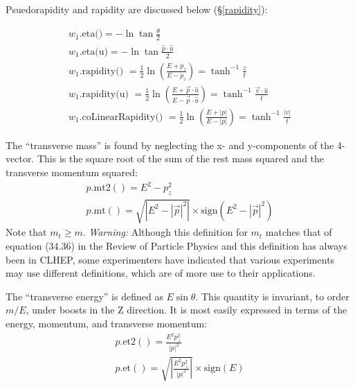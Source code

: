 \documentclass[twoside,12pt]{article}
\begin{document}
Psuedorapidity and rapidity are discussed below (\S\ref{rapidity}):

\begin{eqnarray}
\label{eq:weta}
  w_1\mbox{.eta()} = - \ln \tan \frac{\theta}{2} \\
\label{eq:weta:2}
  w_1\mbox{.eta(u)} = - \ln \tan \frac{\hat{p} \cdot \hat{u}}{2} \\
\label{eq:wrapid}
  w_1\mbox{.rapidity() }
	= \frac{1}{2} \ln \left( \frac{E + p_z}{E - p_z}    \right)
	= \tanh^{-1} \frac {z}{t} \\
\label{eq:wrapid:2}
  w_1\mbox{.rapidity(u) }
	= \frac{1}{2} \ln \left( \frac{E + \vec{p} \cdot \hat{u}}
				      {E - \vec{p} \cdot \hat{u}} \right)
	= \tanh^{-1} \frac {\vec{v} \cdot \hat{u}} {t} \\
\label{eq:wcoLinRap}
  w_1\mbox{.coLinearRapidity() }
	= \frac{1}{2} \ln \left( \frac{E + |p|}{E - |p|}    \right)
	= \tanh^{-1} \frac {|v|}{t}
\end{eqnarray}

\noindent
The ``transverse mass'' is found by neglecting the x- and
y-components of the 4-vector.  This is the square root of the 
sum of the rest mass squared and the transverse momentum squared:
\begin{eqnarray}
\label{eq:wmt2}
  p\mbox{.mt2}() = E^2 - p_z^2 \\
\label{eq:wmt}
  p\mbox{.mt}() = \sqrt { \left| E^2 - |\vec{p}|^2 \right| } 
			\times \mbox{sign}(E^2 - |\vec{p}|^2) 
\end{eqnarray}
\noindent  
Note that $m_t \ge m$.  {\it Warning:} Although this definition for $m_t$
matches that of equation (34.36) in the Review of Particle Physics and this
definition has always been in CLHEP, some experimenters have indicated that 
various experiments may use different definitions, which are of more use to
their applications.  

\noindent
The ``transverse energy'' is defined as $E \sin \theta$.
This quantity is invariant, to order $m/E$, under boosts in the Z direction.
It is most easily expressed in terms of the energy, momentum, and 
transverse momentum:
\begin{eqnarray}
\label{eq:wet2}
  p\mbox{.et2}() = \frac {E^2 p_\perp^2}{|p|^2} \\
\label{eq:wet}
  p\mbox{.et}() = \sqrt { \left| \frac {E^2 p_\perp^2}{|p|^2} \right| } 
			\times \mbox{sign}(E)
\end{eqnarray}
\end{document}
